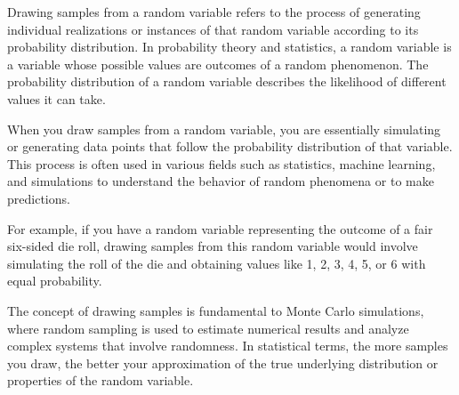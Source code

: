 \documentclass{tufte-handout}
\begin{document}
Drawing samples from a random variable refers to the process of generating individual realizations or instances of that random variable according to its probability distribution. In probability theory and statistics, a random variable is a variable whose possible values are outcomes of a random phenomenon. The probability distribution of a random variable describes the likelihood of different values it can take.

When you draw samples from a random variable, you are essentially simulating or generating data points that follow the probability distribution of that variable. This process is often used in various fields such as statistics, machine learning, and simulations to understand the behavior of random phenomena or to make predictions.

For example, if you have a random variable representing the outcome of a fair six-sided die roll, drawing samples from this random variable would involve simulating the roll of the die and obtaining values like 1, 2, 3, 4, 5, or 6 with equal probability.

The concept of drawing samples is fundamental to Monte Carlo simulations, where random sampling is used to estimate numerical results and analyze complex systems that involve randomness. In statistical terms, the more samples you draw, the better your approximation of the true underlying distribution or properties of the random variable.
\end{document}
